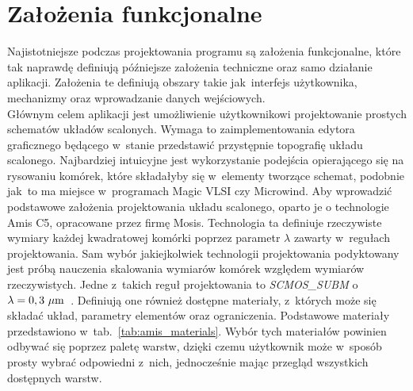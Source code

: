 \section{Założenia funkcjonalne}
\label{sec:zalozenia_funkcjonalne}

Najistotniejsze podczas projektowania programu są założenia funkcjonalne,
które tak naprawdę definiują późniejsze założenia techniczne oraz samo działanie aplikacji.
Założenia te definiują obszary takie jak~interfejs użytkownika, mechanizmy oraz wprowadzanie danych wejściowych.\\
\indent Głównym celem aplikacji jest umożliwienie użytkownikowi projektowanie prostych schematów układów scalonych.
Wymaga to zaimplementowania edytora graficznego będącego w~stanie przedstawić przystępnie topografię układu scalonego.
Najbardziej intuicyjne jest wykorzystanie podejścia opierającego się na rysowaniu komórek,
które składałyby się w~elementy tworzące schemat, podobnie jak~to ma miejsce w~programach Magic VLSI czy Microwind.
Aby wprowadzić podstawowe założenia projektowania układu scalonego, oparto je o technologie Amis C5,
opracowane przez firmę Mosis.
Technologia ta definiuje rzeczywiste wymiary każdej kwadratowej komórki poprzez parametr $\lambda$
zawarty w~regułach projektowania.
Sam wybór jakiejkolwiek technologii projektowania podyktowany
jest próbą nauczenia skalowania wymiarów komórek względem wymiarów rzeczywistych.
Jedne z~takich reguł projektowania to \textit{SCMOS\_SUBM} o $\lambda=0,3~\text{$\mu$m}$~\cite{amis_c5, amis_params}.
Definiują one również dostępne materiały, z~których może się składać układ, parametry elementów oraz ograniczenia.
Podstawowe materiały przedstawiono w~tab.~\ref{tab:amis_materials}.
Wybór tych materiałów powinien odbywać się poprzez paletę warstw,
dzięki czemu użytkownik może w~sposób prosty wybrać odpowiedni z~nich,
jednocześnie mając przegląd wszystkich dostępnych warstw. 

